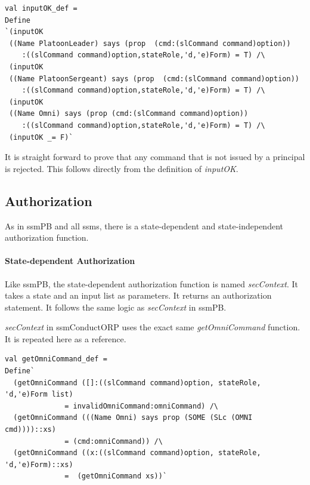 \documentclass[../../main/main.tex]{subfiles}
\begin{document}
\begin{lstlisting}
val inputOK_def =
Define
`(inputOK
 ((Name PlatoonLeader) says (prop  (cmd:(slCommand command)option))
 	:((slCommand command)option,stateRole,'d,'e)Form) = T) /\
 (inputOK
 ((Name PlatoonSergeant) says (prop  (cmd:(slCommand command)option))
 	:((slCommand command)option,stateRole,'d,'e)Form) = T) /\
 (inputOK
 ((Name Omni) says (prop (cmd:(slCommand command)option))
  	:((slCommand command)option,stateRole,'d,'e)Form) = T) /\
 (inputOK _= F)`
 \end{lstlisting}

It is straight forward to prove that any command that is not issued by a principal is rejected.  This follows directly from the definition of \textit{inputOK}.

\HOLssmConductORPTheoremsinputOKXXcmdXXrejectXXlemma


\subsection{Authorization}
As in ssmPB and all \glspl{ssm}, there is a state-dependent and state-independent authorization function.

\paragraph*{State-dependent Authorization}
Like ssmPB, the state-dependent authorization function is named \textit{secContext}.  It takes a state and an input list as parameters.  It returns an authorization statement.  It follows the same logic as \textit{secContext} in ssmPB.

\HOLDfnTag{ConductORPDef}{secContext_def}\HOLConductORPDefDefinitionssecContextXXdef

\textit{secContext} in ssmConductORP uses the exact same \textit{getOmniCommand} function. It is repeated here as a reference.



\begin{lstlisting}
val getOmniCommand_def =
Define`
  (getOmniCommand ([]:((slCommand command)option, stateRole, 'd,'e)Form list)
  		      = invalidOmniCommand:omniCommand) /\
  (getOmniCommand (((Name Omni) says prop (SOME (SLc (OMNI cmd))))::xs)
  		      = (cmd:omniCommand)) /\
  (getOmniCommand ((x:((slCommand command)option, stateRole, 'd,'e)Form)::xs)
  		      =  (getOmniCommand xs))`
\end{lstlisting}
\end{document}
